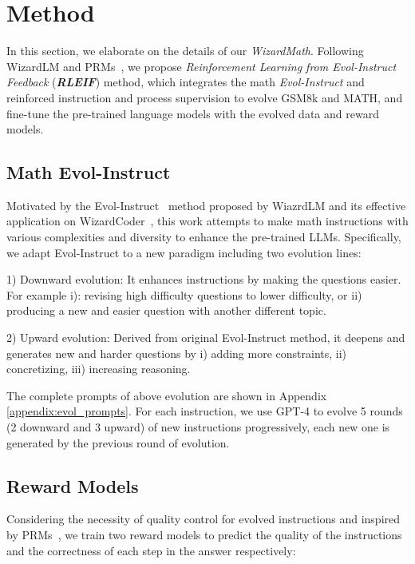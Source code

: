 \section{Method}

In this section, we elaborate on the details of our \emph{WizardMath}. Following WizardLM and PRMs~\citep{lightman2023openai-verify-step-by-step}, we propose \emph{Reinforcement Learning from Evol-Instruct Feedback} (\textbf{\emph{RLEIF}}) method, which integrates the math \emph{Evol-Instruct} and reinforced instruction and process supervision to evolve GSM8k and MATH, and fine-tune the pre-trained language models with the evolved data and reward models. 

\subsection{Math Evol-Instruct}

Motivated by the Evol-Instruct~\citep{xu2023wizardlm} method proposed by WiazrdLM and its effective application on WizardCoder~\citep{luo2023wizardcoder}, this work attempts to make math instructions with various complexities and diversity to enhance the pre-trained LLMs. Specifically, we adapt Evol-Instruct to a new paradigm including two evolution lines:

1) Downward evolution: It enhances instructions by making the questions easier. For example i): revising high difficulty questions to lower difficulty, or ii) producing a new and easier question with another different topic.

2) Upward evolution:  Derived from original Evol-Instruct method, it deepens and generates new and harder questions by i) adding more constraints, ii) concretizing,  iii) increasing reasoning.

The complete prompts of above evolution are shown in Appendix \ref{appendix:evol_prompts}. For each instruction, we use GPT-4 to evolve 5 rounds (2 downward and 3 upward) of new instructions progressively, each new one is generated by the previous round of evolution.

\subsection{Reward Models}\label{section:Reward Models}

Considering the necessity of quality control for evolved instructions  and inspired by PRMs~\citep{lightman2023openai-verify-step-by-step}, we train two reward models to predict the quality of the instructions and  the correctness of each step in the answer respectively:
